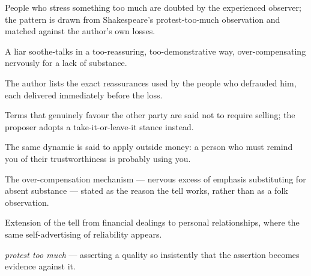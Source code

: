 

\begin{distilled}
  \item People who stress something too much are doubted by the experienced observer; the pattern is drawn from Shakespeare's protest-too-much observation and matched against the author's own losses.
  \item A liar soothe-talks in a too-reassuring, too-demonstrative way, over-compensating nervously for a lack of substance.
  \item The author lists the exact reassurances used by the people who defrauded him, each delivered immediately before the loss.
  \item Terms that genuinely favour the other party are said not to require selling; the proposer adopts a take-it-or-leave-it stance instead.
  \item The same dynamic is said to apply outside money: a person who must remind you of their trustworthiness is probably using you.
\end{distilled}

\begin{unique}
  \item The over-compensation mechanism --- nervous excess of emphasis substituting for absent substance --- stated as the reason the tell works, rather than as a folk observation.
  \item Extension of the tell from financial dealings to personal relationships, where the same self-advertising of reliability appears.
\end{unique}

\begin{terms}
  \item \emph{protest too much} --- asserting a quality so insistently that the assertion becomes evidence against it.
\end{terms}
